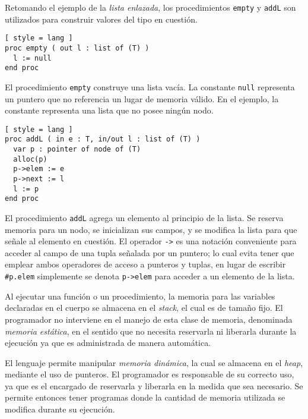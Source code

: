 Retomando el ejemplo de la \textit{lista enlazada}, los procedimientos \lstinline[style = lang]{empty} y \lstinline[style = lang]{addL} son utilizados para construir valores del tipo en cuestión.

\begin{lstlisting}[ style = lang ]
proc empty ( out l : list of (T) )
  l := null
end proc
\end{lstlisting}

El procedimiento \lstinline[style = lang]{empty} construye una lista vacía.
La constante \lstinline[style = lang]{null} representa un puntero que no referencia un lugar de memoria válido.
En el ejemplo, la constante representa una lista que no posee ningún nodo.

\begin{lstlisting}[ style = lang ]
proc addL ( in e : T, in/out l : list of (T) )
  var p : pointer of node of (T)
  alloc(p)
  p->elem := e
  p->next := l
  l := p
end proc
\end{lstlisting}

El procedimiento \lstinline[style = lang]{addL} agrega un elemento al principio de la lista.
Se reserva memoria para un nodo, se inicializan sus campos, y se modifica la lista para que señale al elemento en cuestión.
El operador \lstinline[style = lang]{->} es una notación conveniente para acceder al campo de una tupla señalada por un puntero; lo cual evita tener que emplear ambos operadores de acceso a punteros y tuplas, en lugar de escribir \lstinline[style = lang]{#p.elem} simplemente se denota \lstinline[style = lang]{p->elem} para acceder a un elemento de la lista.

\iffalse
Al ejecutar una función o un procedimiento, la memoria para las variables declaradas en el cuerpo se almacena en el \textit{stack}, el cual es de tamaño fijo.
El programador no interviene en el manejo de esta clase de memoria, denominada \textit{memoria estática}, en el sentido que no necesita reservarla ni liberarla durante la ejecución ya que es administrada de manera automática.

El lenguaje permite manipular \textit{memoria dinámica}, la cual se almacena en el \textit{heap}, mediante el uso de punteros.
El programador es responsable de su correcto uso, ya que es el encargado de reservarla y liberarla en la medida que sea necesario.
Se permite entonces tener programas donde la cantidad de memoria utilizada se modifica durante su ejecución.

